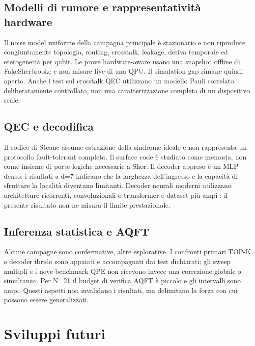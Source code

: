 \subsection{Modelli di rumore e rappresentatività hardware}\label{sec:finale_6_3_2}

Il noise model uniforme della campagna principale è stazionario e non riproduce congiuntamente topologia, routing, crosstalk, leakage, deriva temporale ed eterogeneità per qubit. Le prove hardware-aware usano una snapshot offline di FakeSherbrooke e non misure live di una QPU. Il simulation gap rimane quindi aperto. Anche i test sul crosstalk QEC utilizzano un modello Pauli correlato deliberatamente controllato, non una caratterizzazione completa di un dispositivo reale.

\subsection{QEC e decodifica}\label{sec:finale_6_3_3}

Il codice di Steane assume estrazione della sindrome ideale e non rappresenta un protocollo fault-tolerant completo. Il surface code è studiato come memoria, non come insieme di porte logiche necessarie a Shor. Il decoder appreso è un MLP denso: i risultati a d=7 indicano che la larghezza dell'ingresso e la capacità di sfruttare la località diventano limitanti. Decoder neurali moderni utilizzano architetture ricorrenti, convoluzionali o transformer e dataset più ampi \cite{alphaqubit2024,torlaiMelko2017,yan2026}; il presente risultato non ne misura il limite prestazionale.

\subsection{Inferenza statistica e AQFT}\label{sec:finale_6_3_4}

Alcune campagne sono confermative, altre esplorative. I confronti primari TOP-K e decoder ibrido sono appaiati e accompagnati dai test dichiarati; gli sweep multipli e i nove benchmark QPE non ricevono invece una correzione globale o simultanea. Per N=21 il budget di verifica AQFT è piccolo e gli intervalli sono ampi. Questi aspetti non invalidano i risultati, ma delimitano la forza con cui possono essere generalizzati.

\section{Sviluppi futuri}\label{sec:finale_6_4}

